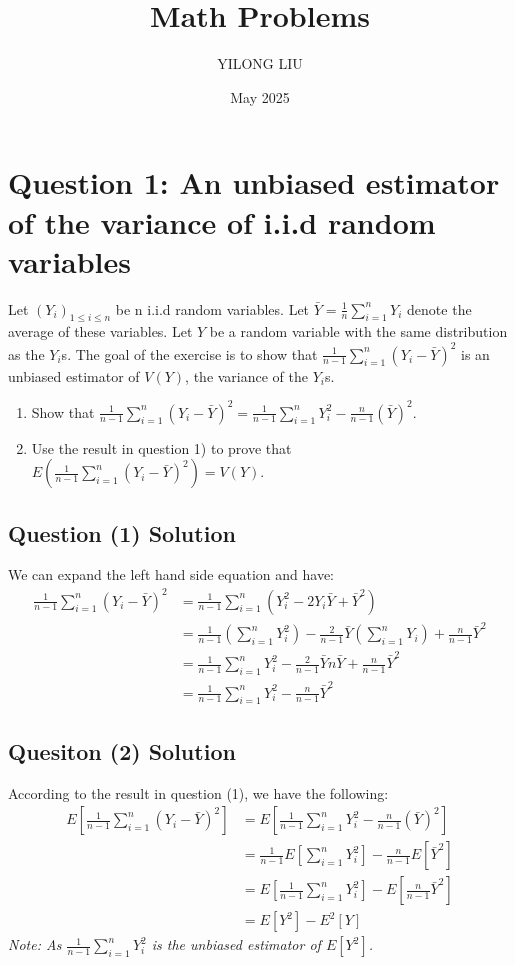 \documentclass{article}
\title{Math Problems}
\author{YILONG LIU}
\date{May 2025}
\begin{document}
\maketitle

\section{Question 1: An unbiased estimator of the variance of i.i.d random variables}
Let $(Y_i)_{1\leq i \leq n}$ be n i.i.d random variables. Let $\bar{Y} = \frac{1}{n} \sum^n_{i=1}{Y_i}$ denote the average of these variables. Let $Y$ be a random variable with the same distribution as the $Y_i$s. The goal of the exercise is to show that $\frac{1}{n-1} \sum^n_{i=1}{(Y_i - \bar{Y})^2}$ is an unbiased estimator of $V(Y)$, the variance of the $Y_i$s.
\begin{enumerate}[label=(\arabic*), leftmargin=*, align=left]
    \item Show that 
    $\frac{1}{n-1} \sum^n_{i=1} (Y_i - \bar{Y})^2 = \frac{1}{n-1}\sum^n_{i=1}{Y^2_i}-\frac{n}{n-1}(\bar{Y})^2$.

    \item Use the result in question 1) to prove that 
    $E\left(\frac{1}{n-1} \sum^n_{i=1}(Y_i-\bar{Y})^2\right)=V(Y)$.
\end{enumerate}

\subsection{Question (1) Solution}
We can expand the left hand side equation and have:
\begin{align*}
\frac{1}{n-1} \sum^n_{i=1} (Y_i-\bar{Y})^2 &= \frac{1}{n-1}\sum^n_{i=1}(Y^2_i-2 Y_i \bar{Y}+\bar{Y}^2)
\\&=\frac{1}{n-1} (\sum^n_{i=1} Y^2_i) - \frac{2}{n-1}\bar{Y}(\sum^n_{i=1} Y_i)+\frac{n}{n-1}\bar{Y}^2
\\&=\frac{1}{n-1}\sum^n_{i=1}Y^2_i - \frac{2}{n-1}\bar{Y}{n \bar{Y}} + \frac{n}{n-1}\bar{Y}^2
\\&=\frac{1}{n-1} \sum^n_{i=1}Y^2_i - \frac{n}{n-1}\bar{Y}^2
\end{align*}

\subsection{Quesiton (2) Solution}
According to the result in question (1), we have the following:
\begin{align*}
E[\frac{1}{n-1}\sum^n_{i=1}(Y_i - \bar{Y})^2] &= E[\frac{1}{n-1} \sum^n_{i=1}Y^2_i - \frac{n}{n-1}(\bar{Y})^2]
\\&=\frac{1}{n-1}E[\sum^n_{i=1}Y^2_i] - \frac{n}{n-1}E[\bar{Y}^2]
\\&=E[\frac{1}{n-1}\sum^n_{i=1}Y^2_i]-E[\frac{n}{n-1}\bar{Y}^2]
\\&=E[Y^2] - E^2[Y]
\end{align*}
\textit{Note: As $\frac{1}{n-1} \sum^n_{i=1}Y^2_i$ is the unbiased estimator of $E[Y^2]$.}
\end{document}
